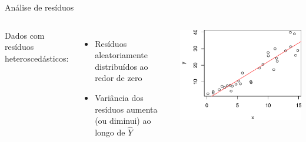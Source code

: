 \documentclass{beamer}\usepackage[]{graphicx}\usepackage[]{color}
\newenvironment{knitrout}{}{} %
\renewenvironment{knitrout}{\setlength{\topsep}{0mm}}{}
\begin{document}
\begin{frame}{Análise de resíduos}

\begin{columns}[c]

\small{Dados com resíduos heteroscedásticos:} \pause

\begin{itemize}


\item Resíduos aleatoriamente distribuídos ao redor de zero 

\item Variância dos resíduos aumenta (ou diminui) ao longo de $\hat Y$ 

\end{itemize}


\begin{knitrout}
\color{fgcolor}
\includegraphics[width=1\linewidth]{figure/r7-1} 


\end{knitrout}
\end{columns}
\end{frame}
\end{document}
